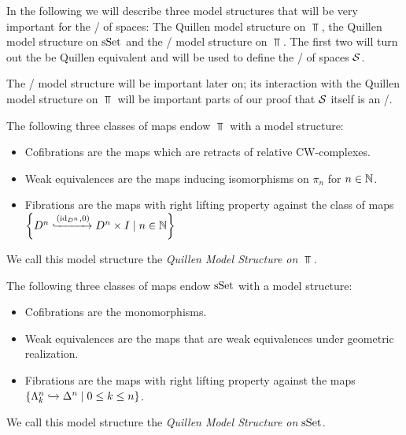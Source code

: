 In the following we will describe three model structures that will be very important for the \inftycat/ of spaces: The Quillen model structure on $\Top$, the Quillen model structure on $\operatorname{sSet}$ and the \Strom/ model structure on $\Top$.
The first two will turn out the be Quillen equivalent and will be used to define the \inftycat/ of spaces $\mathcal{S}$.

The \Strom/ model structure will be important later on; its interaction with the Quillen model structure on $\Top$ will be important parts of our proof that $\mathcal{S}$ itself is an \inftytop/.
\begin{prop}
    The following three classes of maps endow $\Top$ with a model structure:
    \begin{itemize}
        \item Cofibrations are the maps which are retracts of relative CW-complexes. %
        \item Weak equivalences are the maps inducing isomorphisms on $\pi_n$ for $n\in\mathbb{N}$.
        \item Fibrations are the maps with right lifting property against the class of maps $\left\lbrace D^n\xhookrightarrow{\left(\text{id}_{D^n},0\right)}D^n\times I\mid n\in\mathbb{N}\right\rbrace$
    \end{itemize}
    We call this model structure the \emph{Quillen Model Structure on $\Top$}.
\end{prop}
\begin{prop}
    The following three classes of maps endow $\operatorname{sSet}$ with a model structure:
    \begin{itemize}
        \item Cofibrations are the monomorphisms.
        \item Weak equivalences are the maps that are weak equivalences under geometric realization. %
        \item Fibrations are the maps with right lifting property against the maps $\left\lbrace\Lambda_k^n\xhookrightarrow{}\Delta^n\mid 0\leq k\leq n\right\rbrace$.
    \end{itemize}
    We call this model structure the \emph{Quillen Model Structure on $\operatorname{sSet}$}.
\end{prop}
